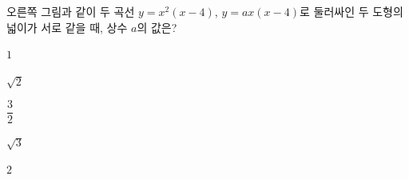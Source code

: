 \noindent\begin{minipage}[t]{0.58\linewidth}\vspace{0pt}\raggedright 오른쪽 그림과 같이 두 곡선 $y=x^2(x-4)$, $y=ax(x-4)$로 둘러싸인 두 도형의 넓이가 서로 같을 때, 상수 $a$의 값은? \end{minipage}\hfill\begin{minipage}[t]{0.4\linewidth}\vspace{0pt}\centering \resizebox{\ifdim\width>\linewidth\linewidth\else\width\fi}{!}{}\end{minipage}\par
\begin{choicesii}{\rule[-3ex]{0pt}{8ex}$1$}{\rule[-3ex]{0pt}{8ex}$\sqrt{2}$}{\rule[-3ex]{0pt}{8ex}$\dfrac{3}{2}$}{\rule[-3ex]{0pt}{8ex}$\sqrt{3}$}{\rule[-3ex]{0pt}{8ex}$2$}\end{choicesii}

